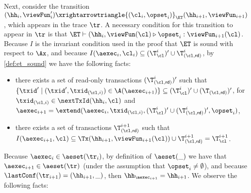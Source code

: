 Next, consider the transition $(\hh_{i}, \viewFun_{i}') \xrightarrowtriangle{(\cl_{i}, \opset_{i})}_{\ET} 
(\hh_{i+1}, \viewFun_{i+1})$, which appears in the trace $\tr$. A necessary condition for this transition 
to appear in $\tr$ is that $\ET \vdash (\hh_{i}, \viewFun(\cl) \triangleright \opset_{i}: \viewFun_{i+1}(\cl)$. 
Because $I$ is the invariant condition used in the proof that $\ET$ is sound with respect to $\Ax$, 
and because 
$I(\aexec_{i}, \cl_{i}) \subseteq (\T^{i}_{\cl})' \cup \T_{(\cl, \mathsf{rd})}^{i}$, 
by \cref{def:et_sound} we have the following facts: 
\begin{itemize}
\item there exists a set of read-only transactions $(\T_{\mathsf(\cl, \mathsf{rd})}^{i})'$ 
such that $\{\txid' \mid (\txid', \txid_{(\cl, i)}) \in \A(\aexec_{i+1})\} \subseteq 
(\T^{i}_{\cl})' \cup (\T_{(\cl, \mathsf{rd})})'$, for 
$\txid_{(\cl, i)} \in \nextTxId(\hh_{i}, \cl)$ and $\aexec_{i+1} = 
\extend(\aexec_{i}, \txid_{(\cl, i)}, (\T^{i}_{\cl})' \cup (\T_{(\cl, \mathsf{rd})}^{i})', \opset_{i})$, 
\item there exists a set of transactions $\T_{\mathsf(\cl, \mathsf{rd})}^{i+1}$ 
such that $I(\aexec_{i+1}, \cl) \subseteq \Tx(\hh_{i+1}, \viewFun_{i+1}(\cl)) \cup \T_{\mathsf(\cl, \mathsf{rd})}^{i+1} = \T_{\cl}^{i+1}$.
\end{itemize} 
Because $\aexec_{i} \in \aeset(\tr_{i})$, by definition of $\aeset(\_)$ we have that 
$\aexec_{i+1} \in \aeset(\tr)$ (under the assumption that $\opset_{i} \neq \emptyset$), 
and because $\lastConf(\tr_{i+1}) = (\hh_{i+1}, \_)$, then $\hh_{\aexec_{i+1}} = \hh_{i+1}$. 
We observe the following facts: 
